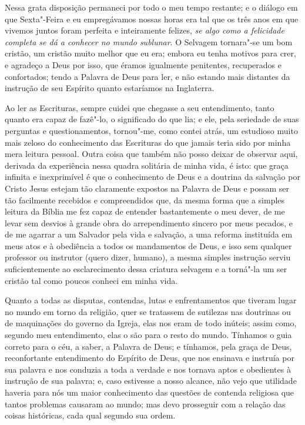Nessa grata disposição permaneci por todo o meu tempo restante; e o
diálogo em que Sexta"-Feira e eu empregávamos nossas horas era tal que os
três anos em que vivemos juntos foram perfeita e inteiramente felizes,
\emph{se algo como a felicidade completa se dá a conhecer no mundo
sublunar}. O Selvagem tornara"-se um bom cristão, um cristão muito melhor
que eu era; embora eu tenha motivos para crer, e agradeço a Deus por
isso, que éramos igualmente penitentes, recuperados e confortados; tendo
a Palavra de Deus para ler, e não estando mais distantes da instrução de
seu Espírito quanto estaríamos na Inglaterra.

Ao ler as Escrituras, sempre cuidei que chegasse a seu entendimento,
tanto quanto era capaz de fazê"-lo, o significado do que lia; e ele, pela
seriedade de suas perguntas e questionamentos, tornou"-me, como contei
atrás, um estudioso muito mais zeloso do conhecimento das Escrituras do
que jamais teria sido por minha mera leitura pessoal. Outra coisa que
também não posso deixar de observar aqui, derivada da experiência nessa
quadra solitária de minha vida, é isto: que graça infinita e
inexprimível é que o conhecimento de Deus e a doutrina da salvação por
Cristo Jesus estejam tão claramente expostos na Palavra de Deus e possam
ser tão facilmente recebidos e compreendidos que, da mesma forma que a
simples leitura da Bíblia me fez capaz de entender bastantemente o meu
dever, de me levar sem desvios à grande obra do arrependimento sincero
por meus pecados, e de me agarrar a um Salvador pela vida e salvação, a
uma reforma instituída em meus atos e à obediência a todos os
mandamentos de Deus, e isso sem qualquer professor ou instrutor (quero
dizer, humano), a mesma simples instrução serviu suficientemente ao
esclarecimento dessa criatura selvagem e a torná"-la um ser cristão tal
como poucos conheci em minha vida.

Quanto a todas as disputas, contendas, lutas e enfrentamentos que
tiveram lugar no mundo em torno da religião, quer se tratassem de
sutilezas nas doutrinas ou de maquinações do governo da Igreja, elas nos
eram de todo inúteis; assim como, segundo meu entendimento, elas o são
para o resto do mundo. Tínhamos o guia correto para o céu, a saber, a
Palavra de Deus; e tínhamos, pela graça de Deus, reconfortante
entendimento do Espírito de Deus, que nos ensinava e instruía por sua
palavra e nos conduzia a toda a verdade e nos tornava aptos e obedientes
à instrução de sua palavra; e, caso estivesse a nosso alcance, não vejo
que utilidade haveria para nós um maior conhecimento das questões de
contenda religiosa que tantos problemas causaram ao mundo; mas devo
prosseguir com a relação das coisas históricas, cada qual segundo sua
ordem.


